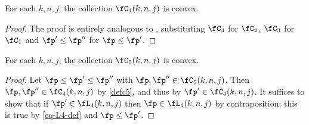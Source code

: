 \begin{lemma}[C4 convex]
    \label{C4-convex}
    \leanok
    For each $k,n,j$, the collection $\fC_4(k,n,j)$ is convex.
\end{lemma}

\begin{proof}
    \leanok
    The proof is entirely analogous to , substituting $\fC_4$ for $\fC_2$,
    $\fC_3$ for $\fC_1$ and $\fp'\le\fp''$ for $\fp\le\fp'$.
\end{proof}

\begin{lemma}[C5 convex]
    \label{C5-convex}
    \leanok
    For each $k,n,j$, the collection $\fC_5(k,n,j)$ is convex.
\end{lemma}

\begin{proof}
    \leanok
    Let $\fp \le \fp' \le\fp''$ with $\fp, \fp'' \in \fC_5(k,n,j)$.
    Then $\fp, \fp'' \in \fC_4(k,n,j)$ by \eqref{defc5}, and thus by  $\fp' \in \fC_4(k,n,j)$.
    It suffices to show that if $\fp' \in \fL_4(k,n,j)$ then $\fp \in \fL_4(k,n,j)$ by contraposition;
    this is true by \eqref{eq-L4-def} and $\fp\le\fp'$.
\end{proof}

